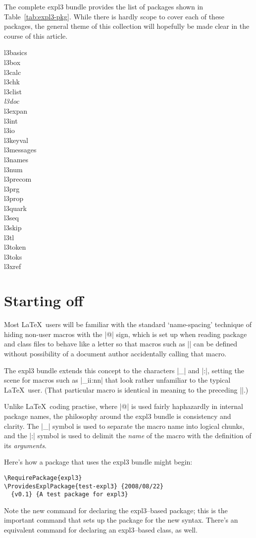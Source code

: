 \documentclass{ltugboat}
\def\pkg#1{\textsf{#1}}
\begin{document}
The complete \pkg{expl3} bundle provides the list of packages shown in
Table~\ref{tab:expl3-pkg}. While there is hardly scope to cover each of these
packages, the general theme of this collection will hopefully be made clear in
the course of this article.

\begin{table}
\caption{Packages provided by \pkg{expl3}; emphasised \emph{\pkg{l3doc}} is
the class used to document \pkg{expl3}-related packages.}
\label{tab:expl3-pkg}
\begin{multicols}{4}
\small\sffamily\centering
\begin{obeylines}
l3basics
l3box
l3calc
l3chk
l3clist
\emph{l3doc}
l3expan
l3int
l3io
l3keyval
l3messages
l3names
l3num
l3precom
l3prg
l3prop
l3quark
l3seq
l3skip
l3tl
l3token
l3toks
l3xref
\end{obeylines}
\end{multicols}
\end{table}

\section{Starting off} 

Most \LaTeX\ users will be familiar with the standard `name-spacing' technique
of hiding non-user macros with the |@| sign, which is set up when reading
package and class files to behave like a letter so that macros such as
|\@secondoftwo| can be defined without possibility of a document author
accidentally calling that macro.

The \pkg{expl3} bundle extends this concept to the characters |_| and |:|,
setting the scene for macros such as |\use_ii:nn| that look rather
unfamiliar to the typical \LaTeX\ user. (That particular macro is identical in
meaning to the preceding |\@secondoftwo|.)

Unlike \LaTeX\ coding practise, where |@| is used fairly haphazardly in
internal package names, the philosophy around the \pkg{expl3} bundle is
consistency and clarity. The |_| symbol is used to separate the macro name
into logical chunks, and the |:| symbol is used to delimit the \emph{name} of
the macro with the definition of its \emph{arguments}.

Here's how a package that uses the \pkg{expl3} bundle might begin:
\begin{lstlisting}
\RequirePackage{expl3}
\ProvidesExplPackage{test-expl3} {2008/08/22}
  {v0.1} {A test package for expl3}
\end{lstlisting}
Note the new command for declaring the \pkg{expl3}--based package; this is the
important command that sets up the package for the new syntax. There's an
equivalent command for declaring an \pkg{expl3}--based class, as well.
\end{document}
